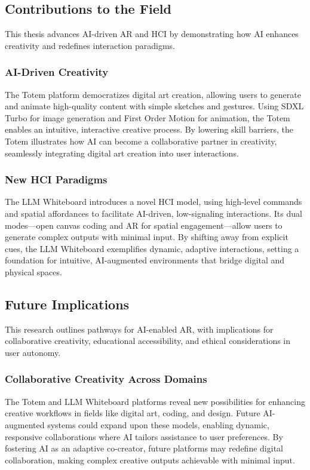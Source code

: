 \subsection{Contributions to the Field}

This thesis advances AI-driven AR and HCI by demonstrating how AI enhances creativity and redefines interaction paradigms.

\subsubsection{AI-Driven Creativity}
The Totem platform democratizes digital art creation, allowing users to generate and animate high-quality content with simple sketches and gestures.
Using SDXL Turbo for image generation and First Order Motion for animation, the Totem enables an intuitive, interactive creative process.
By lowering skill barriers, the Totem illustrates how AI can become a collaborative partner in creativity, seamlessly integrating digital art creation into user interactions.

\subsubsection{New HCI Paradigms}
The LLM Whiteboard introduces a novel HCI model, using high-level commands and spatial affordances to facilitate AI-driven, low-signaling interactions.
Its dual modes—open canvas coding and AR for spatial engagement—allow users to generate complex outputs with minimal input.
By shifting away from explicit cues, the LLM Whiteboard exemplifies dynamic, adaptive interactions, setting a foundation for intuitive, AI-augmented environments that bridge digital and physical spaces.

\subsection{Future Implications}

This research outlines pathways for AI-enabled AR, with implications for collaborative creativity, educational accessibility, and ethical considerations in user autonomy.

\subsubsection{Collaborative Creativity Across Domains}
The Totem and LLM Whiteboard platforms reveal new possibilities for enhancing creative workflows in fields like digital art, coding, and design.
Future AI-augmented systems could expand upon these models, enabling dynamic, responsive collaborations where AI tailors assistance to user preferences.
By fostering AI as an adaptive co-creator, future platforms may redefine digital collaboration, making complex creative outputs achievable with minimal input.

